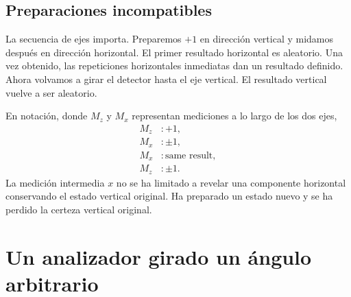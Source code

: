 \subsection{Preparaciones incompatibles}

La secuencia de ejes importa. Preparemos \(+1\) en dirección vertical y midamos después en dirección horizontal. El primer resultado horizontal es aleatorio. Una vez obtenido, las repeticiones horizontales inmediatas dan un resultado definido. Ahora volvamos a girar el detector hasta el eje vertical. El resultado vertical vuelve a ser aleatorio.

En notación, donde \(M_z\) y \(M_x\) representan mediciones a lo largo de los dos ejes,
\begin{equation}
\begin{aligned}
  M_z&:+1,\\
  M_x&:\pm1,\\
  M_x&:\text{same result},\\
  M_z&:\pm1.
\end{aligned}
\end{equation}
La medición intermedia \(x\) no se ha limitado a revelar una componente horizontal conservando el estado vertical original. Ha preparado un estado nuevo y se ha perdido la certeza vertical original.

\begin{classroomqa}
\end{classroomqa}

\begin{classroomqa}
\end{classroomqa}

\section{Un analizador girado un ángulo arbitrario}

